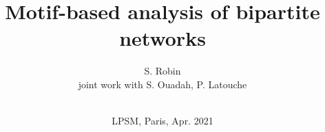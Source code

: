 \documentclass[8pt]{beamer}
\begin{document}

\title[Bipartite motifs]{Motif-based analysis of bipartite networks \\}

\author[S. Robin]{S. Robin \\ \medskip
joint work with S. Ouadah, P. Latouche \\ ~}


\date[Paris, Apr.'21]{LPSM, Paris, Apr. 2021}

\maketitle
\end{document}
